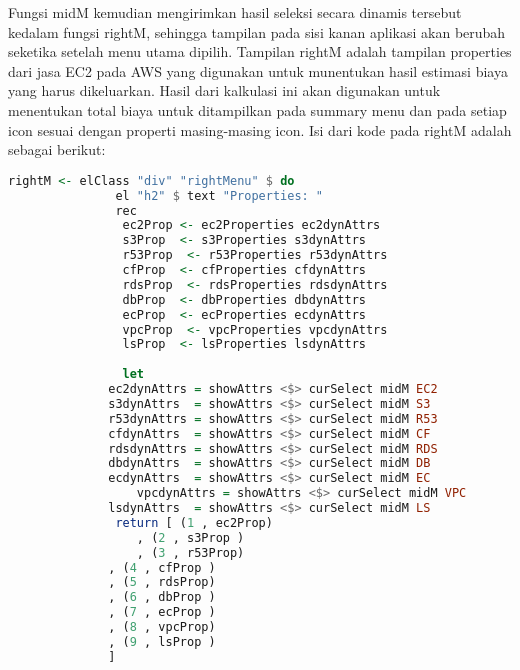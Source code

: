\documentclass[pi.tex]{subfile}
\begin{document}
  Fungsi midM kemudian mengirimkan hasil seleksi secara dinamis tersebut kedalam fungsi rightM, sehingga tampilan pada sisi kanan aplikasi akan berubah seketika setelah menu utama dipilih. Tampilan rightM adalah tampilan properties dari jasa EC2 pada AWS yang digunakan untuk munentukan hasil estimasi biaya yang harus dikeluarkan. Hasil dari kalkulasi ini akan digunakan untuk menentukan total biaya untuk ditampilkan pada summary menu dan pada setiap icon sesuai dengan properti masing-masing icon. Isi dari kode pada rightM adalah sebagai berikut:
     
   \begin{lstlisting}[language=Haskell]
    rightM <- elClass "div" "rightMenu" $ do
               el "h2" $ text "Properties: "
               rec
                ec2Prop <- ec2Properties ec2dynAttrs
                s3Prop  <- s3Properties s3dynAttrs
                r53Prop  <- r53Properties r53dynAttrs
                cfProp  <- cfProperties cfdynAttrs
                rdsProp  <- rdsProperties rdsdynAttrs
                dbProp  <- dbProperties dbdynAttrs
                ecProp  <- ecProperties ecdynAttrs
                vpcProp  <- vpcProperties vpcdynAttrs
                lsProp  <- lsProperties lsdynAttrs
      
                let 
	          ec2dynAttrs = showAttrs <$> curSelect midM EC2
	          s3dynAttrs  = showAttrs <$> curSelect midM S3
	          r53dynAttrs = showAttrs <$> curSelect midM R53
	          cfdynAttrs  = showAttrs <$> curSelect midM CF
	          rdsdynAttrs = showAttrs <$> curSelect midM RDS
	          dbdynAttrs  = showAttrs <$> curSelect midM DB
	          ecdynAttrs  = showAttrs <$> curSelect midM EC
                  vpcdynAttrs = showAttrs <$> curSelect midM VPC
	          lsdynAttrs  = showAttrs <$> curSelect midM LS
               return [ (1 , ec2Prop)
	              , (2 , s3Prop )
	              , (3 , r53Prop)
		      , (4 , cfProp )
		      , (5 , rdsProp)
		      , (6 , dbProp )
		      , (7 , ecProp )
		      , (8 , vpcProp)
		      , (9 , lsProp )
		      ]
   \end{lstlisting}
\end{document}
